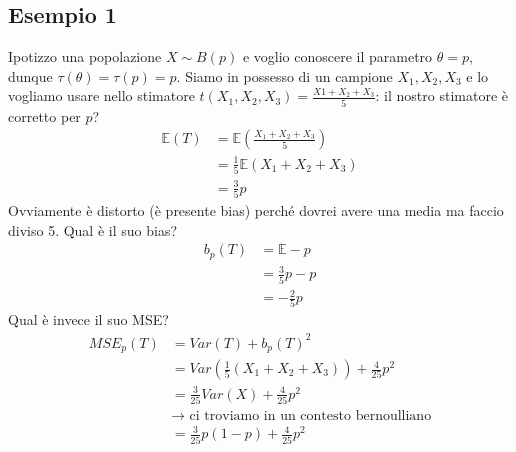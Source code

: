\documentclass[11pt]{report}
\begin{document}
\subsection{Esempio 1}
Ipotizzo una popolazione $X \sim B(p)$ e voglio conoscere il parametro $\theta = p$, dunque $\tau(\theta) = \tau(p) = p$. Siamo in possesso di un campione $X_1, X_2, X_3$ e lo vogliamo usare nello stimatore $t(X_1, X_2, X_3) = \frac{X1 + X_2 + X_3}{5}$: il nostro stimatore è corretto per $p$?
\begin{equation}
	\begin{split}
		\mathbb{E}(T) & = \mathbb{E} \left( \frac{X_1 + X_2 + X_3}{5} \right)\\
		& = \frac{1}{5} \mathbb{E}(X_1 + X_2 + X_3)\\
		& = \frac{3}{5}p
	\end{split}
\end{equation}
Ovviamente è distorto (è presente bias) perché dovrei avere una media ma faccio diviso 5. Qual è il suo bias?
\begin{equation}
    \begin{split}
        b_p(T) & = \mathbb{E} - p\\
        & = \frac{3}{5}p - p\\
        & = -\frac{2}{5}p
    \end{split}
\end{equation}
Qual è invece il suo MSE?
\begin{equation}
    \begin{split}
        MSE_p(T) & = Var(T) + b_p(T)^2\\
        & = Var \left( \frac{1}{5} (X_1 + X_2 + X_3) \right) + \frac{4}{25}p^2\\
        & = \frac{3}{25} Var(X) + \frac{4}{25}p^2\\
        & \rightarrow \text{ ci troviamo in un contesto bernoulliano}\\
        & = \frac{3}{25}p(1-p) + \frac{4}{25}p^2\\
    \end{split}
\end{equation}
\end{document}
